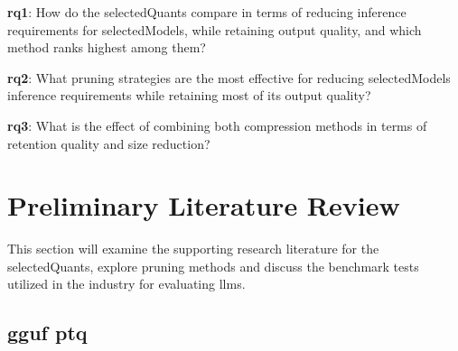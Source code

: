 \documentclass{ifacconf}
\begin{document}
	\textbf{\gls{rq}1}: How do the \gls{selectedQuants} compare in terms of reducing inference requirements for \gls{selectedModels}, while retaining output quality, and which method ranks highest among them?
	
	\textbf{\gls{rq}2}: What pruning strategies are the most effective for reducing \gls{selectedModels} inference requirements while retaining most of its output quality?
	
	\textbf{\gls{rq}3}: What is the effect of combining both compression methods in terms of retention quality and size reduction?
	
	
	\section{Preliminary Literature Review}
	This section will examine the supporting research literature for the \gls{selectedQuants}, explore pruning methods and discuss the benchmark tests utilized in the industry for evaluating \glspl{llm}.
	
	\subsection{\gls{gguf} \gls{ptq}}
	
\end{document}
